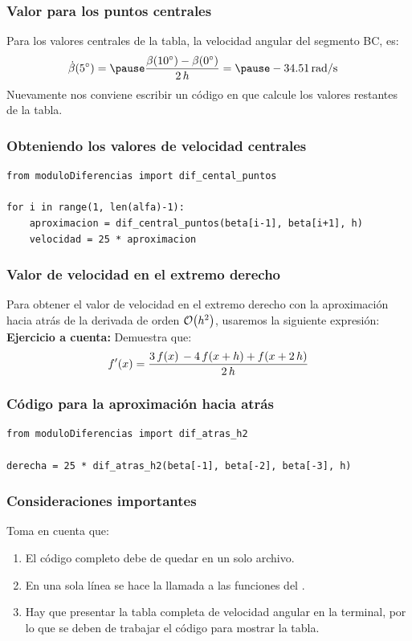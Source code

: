 \documentclass[12pt]{beamer}
\begin{document}
\begin{frame}
\frametitle{Valor para los puntos centrales}
Para los valores centrales de la tabla, la velocidad angular del segmento BC, es:
\pause
\begin{eqnarray*}
\begin{aligned}
\dot{\beta}(\ang{5}) &= \pause \dfrac{\beta(\ang{10})- \beta(\ang{0})}{2 \, h} = \pause \SI[per-mode=symbol]{-34.51}{\radian\per\second}
\end{aligned}
\end{eqnarray*}
\pause
Nuevamente nos conviene escribir un código en \python{} que calcule los valores restantes de la tabla.
\end{frame}
\begin{frame}[fragile]
\frametitle{Obteniendo los valores de velocidad centrales}
\begin{lstlisting}[caption=Código para obtener los valores de velocidad centrales]
from moduloDiferencias import dif_cental_puntos

for i in range(1, len(alfa)-1):
    aproximacion = dif_central_puntos(beta[i-1], beta[i+1], h)
    velocidad = 25 * aproximacion
\end{lstlisting}
\end{frame}
\begin{frame}
\frametitle{Valor de velocidad en el extremo derecho}
Para obtener el valor de velocidad en el extremo derecho con la aproximación hacia atrás de la derivada de orden $\order{h^{2}}$, usaremos la siguiente expresión:
\\
\bigskip
\pause
\textbf{Ejercicio a cuenta:} Demuestra que:
\begin{align*}
{f}^{\prime} (x) = \dfrac{3 \, f (x) \, - 4 \, f (x + h) + f (x + 2 \, h)}{2 \, h}
\end{align*}
\end{frame}
\begin{frame}[fragile]
\frametitle{Código para la aproximación hacia atrás}
\begin{lstlisting}[caption=Código para la aproximación hacia atrás de la derivada]
from moduloDiferencias import dif_atras_h2

derecha = 25 * dif_atras_h2(beta[-1], beta[-2], beta[-3], h)
\end{lstlisting}
\end{frame}
\begin{frame}
\frametitle{Consideraciones importantes}
Toma en cuenta que: 
\begin{enumerate}[<+->]
\item El código completo debe de quedar en un solo archivo.
\item En una sola línea se hace la llamada a las funciones del .
\item Hay que presentar la tabla completa de velocidad angular en la terminal, por lo que se deben de trabajar el código para mostrar la tabla.
\seti
\end{enumerate}
\end{frame}
\end{document}
